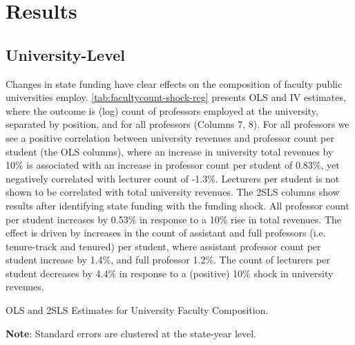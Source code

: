 \section{Results}
\label{sec:results}

\subsection{University-Level}

Changes in state funding have clear effects on the composition of faculty public universities employ.
\autoref{tab:facultycount-shock-reg} presents OLS and IV estimates, where the outcome is (log) count of professors employed at the university, separated by position, and for all professors (Columns 7, 8).
For all professors we see a positive correlation between university revenues and professor count per student (the OLS columns), where an increase in university total revenues by 10\% is associated with an increase in professor count per student of 0.83\%, yet negatively correlated with lecturer count of -1.3\%.
Lecturers per student is not shown to be correlated with total university revenues.
The 2SLS columns show results after identifying state funding with the funding shock.
All professor count per student increases by 0.53\% in response to a 10\% rise in total revenues.
The effect is driven by increases in the count of assistant and full professors (i.e. tenure-track and tenured) per student, where assistant professor count per student increase by 1.4\%, and full professor 1.2\%.
The count of lecturers per student decreases by 4.4\% in response to a (positive) 10\% shock in university revenues.

\begin{table}[h!]
    \singlespacing
    \centering
    \caption{OLS and 2SLS Estimates for University Faculty Composition.}
    \makebox[\textwidth][c]{}
    \begin{flushleft}
        \footnotesize
        \textbf{Note}: Standard errors are clustered at the state-year level.
    \end{flushleft}
    \label{tab:facultycount-shock-reg}
\end{table}


